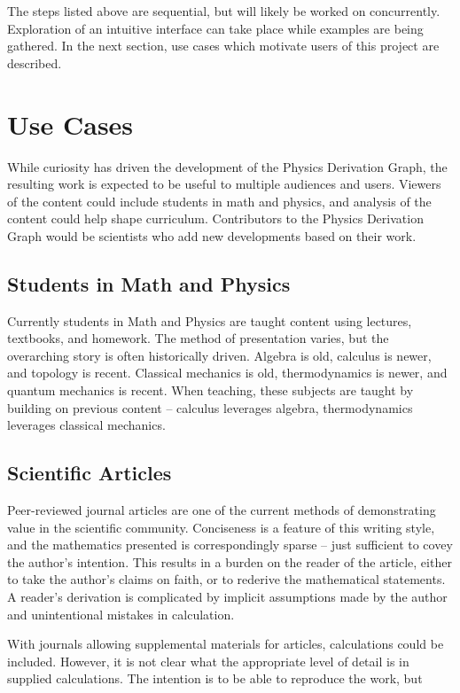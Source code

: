 \documentclass{article}
\begin{document}
\begin{multicols}{2}
The steps listed above are sequential, but will likely be worked on concurrently. Exploration of an intuitive interface can take place while examples are being gathered. In the next section, use cases which motivate users of this project are described. 

\section{Use Cases}

While curiosity has driven the development of the Physics Derivation Graph, the resulting work is expected to be useful to multiple audiences and users. Viewers of the content could include students in math and physics, and analysis of the content could help shape curriculum. Contributors to the Physics Derivation Graph would be scientists who add new developments based on their work.

\subsection{Students in Math and Physics}

Currently students in Math and Physics are taught content using lectures, textbooks, and homework. The method of presentation varies, but the overarching story is often historically driven. Algebra is old, calculus is newer, and topology is recent. Classical mechanics is old, thermodynamics is newer, and quantum mechanics is recent. When teaching, these subjects are taught by building on previous content -- calculus leverages algebra, thermodynamics leverages classical mechanics. 

\subsection{Scientific Articles}

Peer-reviewed journal articles are one of the current methods of demonstrating value in the scientific community. Conciseness is a feature of this writing style, and the mathematics presented is correspondingly sparse -- just sufficient to covey the author's intention. This results in a burden on the reader of the article, either to take the author's claims on faith, or to rederive the mathematical statements. A reader's derivation is complicated by implicit assumptions made by the author and unintentional mistakes in calculation. 

With journals allowing supplemental materials for articles, calculations could be included. However, it is not clear what the appropriate level of detail is in supplied calculations. The intention is to be able to reproduce the work, but 


\end{multicols}
\end{document}
